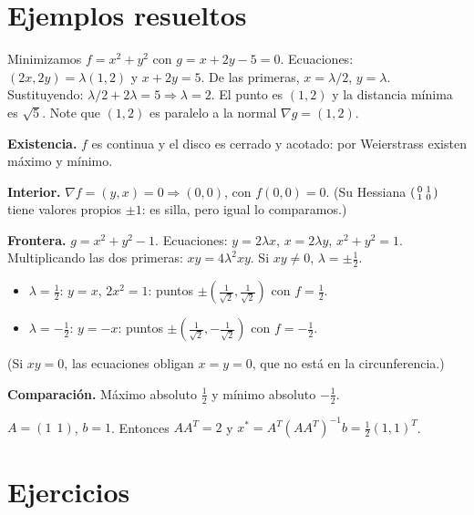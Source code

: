 \documentclass[11pt,a4paper]{article}
\begin{document}
\section{Ejemplos resueltos}

\begin{ejemplo}[Ejemplo 1 (Clase 15). Punto de la recta $x+2y=5$ más cercano al origen]
Minimizamos $f=x^2+y^2$ con $g=x+2y-5=0$. Ecuaciones: $(2x,2y)=\lambda(1,2)$ y $x+2y=5$.
De las primeras, $x=\lambda/2$, $y=\lambda$. Sustituyendo: $\lambda/2+2\lambda=5\Rightarrow\lambda=2$.
El punto es $(1,2)$ y la distancia mínima es $\sqrt5$. Note que $(1,2)$ es paralelo a la normal $\nabla g=(1,2)$.
\end{ejemplo}

\begin{ejemplo}[Ejemplo 2 (Clase 16). Extremos absolutos de $f=xy$ en el disco $x^2+y^2\le1$]
\textbf{Existencia.} $f$ es continua y el disco es cerrado y acotado: por Weierstrass existen máximo y mínimo.

\textbf{Interior.} $\nabla f=(y,x)=0\Rightarrow(0,0)$, con $f(0,0)=0$. (Su Hessiana $\begin{psmallmatrix}0&1\\1&0\end{psmallmatrix}$ tiene valores propios $\pm1$: es silla, pero igual lo comparamos.)

\textbf{Frontera.} $g=x^2+y^2-1$. Ecuaciones: $y=2\lambda x$, $x=2\lambda y$, $x^2+y^2=1$. Multiplicando las dos primeras: $xy=4\lambda^2xy$. Si $xy\neq0$, $\lambda=\pm\frac12$.
\begin{itemize}[leftmargin=*,itemsep=0pt]
\item $\lambda=\tfrac12$: $y=x$, $2x^2=1$: puntos $\pm(\tfrac1{\sqrt2},\tfrac1{\sqrt2})$ con $f=\tfrac12$.
\item $\lambda=-\tfrac12$: $y=-x$: puntos $\pm(\tfrac1{\sqrt2},-\tfrac1{\sqrt2})$ con $f=-\tfrac12$.
\end{itemize}
(Si $xy=0$, las ecuaciones obligan $x=y=0$, que no está en la circunferencia.)

\textbf{Comparación.} Máximo absoluto $\tfrac12$ y mínimo absoluto $-\tfrac12$.
\end{ejemplo}

\begin{ejemplo}[Ejemplo 3 (Clase 16). Solución de norma mínima de $x_1+x_2=1$]
$A=(1\ \ 1)$, $b=1$. Entonces $AA^T=2$ y $x^*=A^T(AA^T)^{-1}b=\tfrac12(1,1)^T$.
\end{ejemplo}

\section{Ejercicios}
\end{document}
